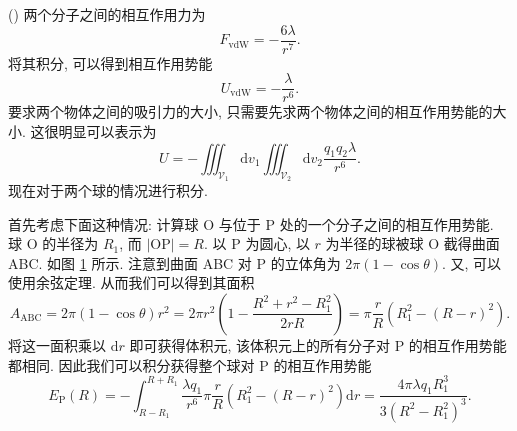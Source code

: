 \documentclass{article}
\newcounter{para}
\newcommand\mypara{\par\refstepcounter{para}(\thepara)\space}
\begin{document}
\mypara
两个分子之间的相互作用力为
\begin{equation}
	F_{\mathrm{vdW}}=-\frac{6\lambda}{r^7}.
\end{equation}
将其积分, 可以得到相互作用势能
\begin{equation}
	U_{\mathrm{vdW}}=-\frac\lambda{r^6}.
\end{equation}
要求两个物体之间的吸引力的大小, 只需要先求两个物体之间的相互作用势能的大小.
这很明显可以表示为
\begin{equation}
	U=-\iiint_{\mathcal V_1}\mathrm dv_1\iiint_{\mathcal V_2}\mathrm dv_2
	\frac{q_1q_2\lambda}{r^6}.
\end{equation}
现在对于两个球的情况进行积分.

首先考虑下面这种情况: 计算球 O 与位于 P 处的一个分子之间的相互作用势能.
球 O 的半径为 $R_1$, 而 $\left|\mathrm{OP}\right|=R$.
以 P 为圆心, 以 $r$ 为半径的球被球 O 截得曲面 ABC.
如图 \ref{fig:对一个球积分} 所示.
注意到曲面 ABC 对 P 的立体角为 $2\pi\left(1-\cos\theta\right)$.
又, 可以使用余弦定理. 从而我们可以得到其面积
\begin{equation}
	A_{\mathrm{ABC}}=2\pi\left(1-\cos\theta\right)r^2
	=2\pi r^2\left(1-\frac{R^2+r^2-R_1^2}{2rR}\right)
	=\pi\frac rR\left(R_1^2-\left(R-r\right)^2\right).
\end{equation}
将这一面积乘以 $\mathrm dr$ 即可获得体积元, 该体积元上的所有分子对 P 的相互作用势能都相同.
因此我们可以积分获得整个球对 P 的相互作用势能
\begin{equation}
	\label{eq:球对分子的势能}
	E_\mathrm P\!\left(R\right)=-\int_{R-R_1}^{R+R_1}\frac{\lambda q_1}{r^6}
	\pi\frac rR\left(R_1^2-\left(R-r\right)^2\right)\mathrm dr
	=\frac{4\pi\lambda q_1R_1^3}{3\left(R^2-R_1^2\right)^3}.
\end{equation}

\begin{figure}[h!]
	\centering
	\caption{}
	\label{fig:对一个球积分}
\end{figure}
\end{document}
